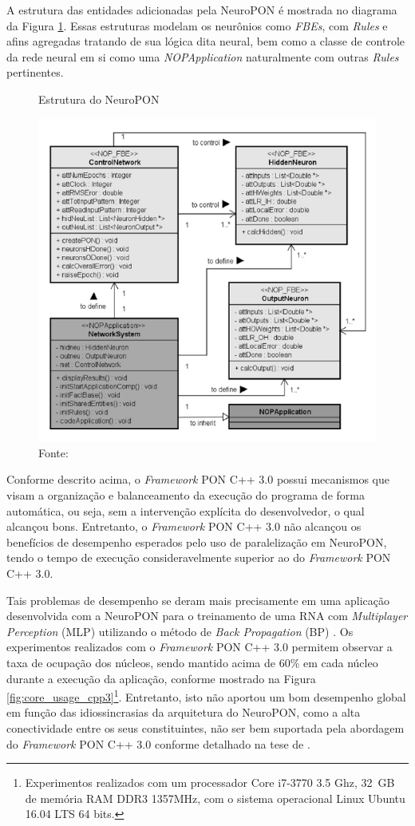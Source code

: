 A estrutura das entidades adicionadas pela NeuroPON é mostrada no diagrama da
Figura \ref{fig:neuro_struct}. Essas estruturas modelam os neurônios como
\textit{FBEs}, com \textit{Rules} e afins agregadas tratando de sua lógica dita
neural, bem como a classe de controle da rede neural em si como uma
\textit{NOPApplication} naturalmente com outras \textit{Rules} pertinentes.

\begin{figure}[!htb]
  \centering
  \caption{Estrutura do NeuroPON}
  \includegraphics[width=.6\textwidth]{../figures/neuropon_struct.png}
  \caption*{Fonte: }
  \label{fig:neuro_struct}
\end{figure}

Conforme descrito acima, o \textit{Framework} PON C++ 3.0 possui mecanismos que
visam a organização e balanceamento da execução do programa de forma automática,
ou seja, sem a intervenção explícita do desenvolvedor, o qual alcançou bons.
Entretanto, o \textit{Framework} PON C++ 3.0 não alcançou os benefícios de
desempenho esperados pelo uso de paralelização em NeuroPON, tendo o tempo de
execução consideravelmente superior ao do \textit{Framework} PON C++ 3.0.

Tais problemas de desempenho se deram mais precisamente em uma aplicação
desenvolvida com a NeuroPON para o treinamento de uma RNA com
\textit{Multiplayer Perception} (MLP) utilizando o método de \textit{Back
Propagation} (BP) \cite{schutz_2018}. Os experimentos realizados com o
\textit{Framework} PON C++ 3.0 permitem observar a taxa de ocupação dos núcleos,
sendo mantido acima de 60\% em cada núcleo durante a execução da aplicação,
conforme mostrado na Figura \ref{fig:core_usage_cpp3}\footnote{Experimentos
realizados com um processador Core i7-3770 3.5 Ghz, 32 GB de memória RAM DDR3
1357MHz, com o sistema operacional Linux Ubuntu 16.04 LTS 64 bits.}. Entretanto,
isto não aportou um bom desempenho global em função das idiossincrasias da
arquitetura do NeuroPON, como a alta conectividade entre os seus constituintes,
não ser bem suportada pela abordagem do \textit{Framework} PON C++ 3.0 conforme
detalhado na tese de .

